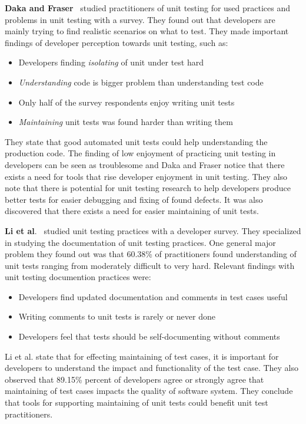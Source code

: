     \textbf{Daka and Fraser}~\cite{daka2014survey} studied practitioners of unit testing for used practices and problems in unit testing with a survey.
    They found out that developers are mainly trying to find realistic scenarios on what to test.
    They made important findings of developer perception towards unit testing, such as:
    \begin{itemize}
    \item Developers finding \textit{isolating} of unit under test hard
    \item \textit{Understanding} code is bigger problem than understanding test code
    \item Only half of the survey respondents enjoy writing unit tests
    \item \textit{Maintaining} unit tests was found harder than writing them
    \end{itemize}
    They state that good automated unit tests could help understanding the production code.
    The finding of low enjoyment of practicing unit testing in developers can be seen as troublesome
    and Daka and Fraser notice that there exists a need for tools that rise developer enjoyment in unit testing.
    They also note that there is potential for unit testing research to help developers produce better tests for easier debugging and fixing
    of found defects. It was also discovered that there exists a need for easier maintaining of unit tests.

    \textbf{Li et al}.~\cite{li2016automatically} studied unit testing practices with a developer survey. They specialized in studying
    the documentation of unit testing practices. One general major problem they found out was that 60.38\% of practitioners found understanding of
    unit tests ranging from moderately difficult to very hard. Relevant findings with unit testing documention practices
    were:

    \begin{itemize}
    \item Developers find updated documentation and comments in test cases useful
    \item Writing comments to unit tests is rarely or never done
    \item Developers feel that tests should be self-documenting without comments
    \end{itemize}

    Li et al. state that for effecting maintaining of test cases, it is important for developers to understand the impact and
    functionality of the test case. They also observed that 89.15\% percent of developers agree or strongly agree that maintaining
    of test cases impacts the quality of software system. They conclude that tools for supporting maintaining of unit tests could
    benefit unit test practitioners.

